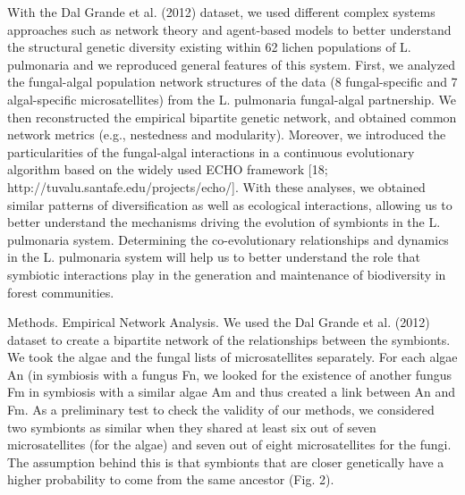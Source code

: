 \documentclass[runningheads,a4paper]{llncs}
\begin{document}
With the Dal Grande et al. (2012) dataset, we used different complex systems approaches such as network theory and agent-based models to better understand the structural genetic diversity existing within 62 lichen populations of L. pulmonaria and we reproduced general features of this system. First, we analyzed the fungal-algal population network structures of the data (8 fungal-specific and 7 algal-specific microsatellites) from the L. pulmonaria fungal-algal partnership. We then reconstructed the empirical bipartite genetic network, and obtained common network metrics (e.g., nestedness and modularity). Moreover, we introduced the particularities of the fungal-algal interactions in a continuous evolutionary algorithm based on the widely used ECHO framework [18; http://tuvalu.santafe.edu/projects/echo/]. With these analyses, we obtained similar patterns of diversification as well as ecological interactions, allowing us to better understand the mechanisms driving the evolution of symbionts in the L. pulmonaria system. Determining the co-evolutionary relationships and dynamics in the L. pulmonaria system will help us to better understand the role that symbiotic interactions play in the generation and maintenance of biodiversity in forest communities.

Methods. 
Empirical Network Analysis. 
We  used the Dal Grande et al. (2012) dataset to create a bipartite network of the relationships between the symbionts. We took the algae and the fungal lists of microsatellites separately. For each algae An (in symbiosis with a fungus Fn, we looked for the existence of another fungus Fm in symbiosis with a similar algae Am and thus created a link between An and Fm. As a preliminary test to check the validity of our methods, we considered two symbionts as similar when they shared at least six out of seven microsatellites (for the algae) and seven out of eight microsatellites for the fungi. The assumption behind this is that symbionts that are closer genetically have a higher probability to come from the same ancestor (Fig. 2). 
\end{document}
